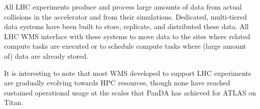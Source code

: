 All LHC experiments produce and process large amounts  of data from actual
collisions in the accelerator and from their simulations. Dedicated,  
multi-tiered data systems have been built to store, replicate, and distributed these
data. All LHC WMS interface with these systems to move data to the sites where
related compute tasks are executed or to schedule compute tasks where (large
amount of) data are already stored.

It is interesting to note that most WMS developed to support LHC experiments are gradually evolving towards HPC resources, though none have reached sustained operational usage at the scales that PanDA has achieved for ATLAS on Titan.



